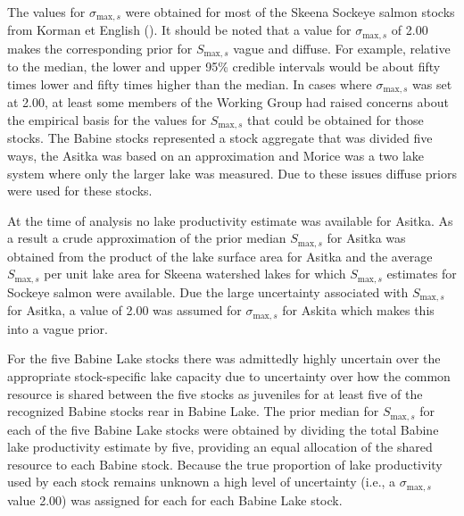 \documentclass[french,11pt]{book}
\begin{document}
\endgroup{} \endgroup{}

The values for \(\sigma_{\textrm{max},s}\) were obtained for most of the Skeena Sockeye salmon stocks from Korman et English (). It should be noted that a value for \(\sigma_{\textrm{max},s}\) of 2.00 makes the corresponding prior for \(S_{\textrm{max},s}\) vague and diffuse. For example, relative to the median, the lower and upper 95\% credible intervals would be about fifty times lower and fifty times higher than the median. In cases where \(\sigma_{\textrm{max},s}\) was set at 2.00, at least some members of the Working Group had raised concerns about the empirical basis for the values for \(S_{\textrm{max},s}\) that could be obtained for those stocks. The Babine stocks represented a stock aggregate that was divided five ways, the Asitka was based on an approximation and Morice was a two lake system where only the larger lake was measured. Due to these issues diffuse priors were used for these stocks.

At the time of analysis no lake productivity estimate was available for Asitka. As a result a crude approximation of the prior median \(S_{\textrm{max},s}\) for Asitka was obtained from the product of the lake surface area for Asitka and the average \(S_{\textrm{max},s}\) per unit lake area for Skeena watershed lakes for which \(S_{\textrm{max},s}\) estimates for Sockeye salmon were available. Due the large uncertainty associated with \(S_{\textrm{max},s}\) for Asitka, a value of 2.00 was assumed for \(\sigma_{\textrm{max},s}\) for Askita which makes this into a vague prior.

For the five Babine Lake stocks there was admittedly highly uncertain over the appropriate stock-specific lake capacity due to uncertainty over how the common resource is shared between the five stocks as juveniles for at least five of the recognized Babine stocks rear in Babine Lake. The prior median for \(S_{\textrm{max},s}\) for each of the five Babine Lake stocks were obtained by dividing the total Babine lake productivity estimate by five, providing an equal allocation of the shared resource to each Babine stock. Because the true proportion of lake productivity used by each stock remains unknown a high level of uncertainty (i.e., a \(\sigma_{\textrm{max},s}\) value 2.00) was assigned for each for each Babine Lake stock.
\end{document}
